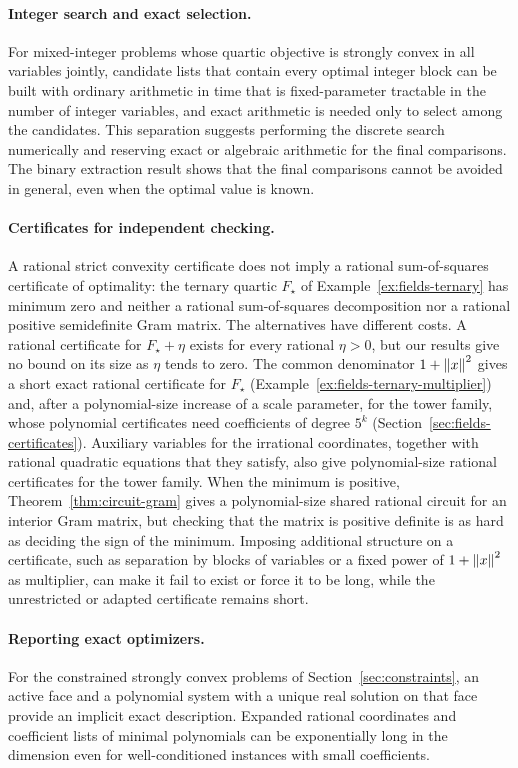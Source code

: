 \paragraph{Integer search and exact selection.}
For mixed-integer problems whose quartic objective is strongly convex in all
variables jointly, candidate lists that contain every optimal integer block
can be built with ordinary arithmetic in time that is fixed-parameter
tractable in the number of integer variables, and exact arithmetic is needed
only to select among the candidates. This
separation suggests performing the discrete search numerically and reserving
exact or algebraic arithmetic for the final comparisons. The binary
extraction result shows that the final comparisons cannot be avoided in
general, even when the optimal value is known.

\paragraph{Certificates for independent checking.}
A rational strict convexity certificate does not imply a rational
sum-of-squares certificate of optimality: the ternary quartic $F_\star$ of
Example~\ref{ex:fields-ternary} has minimum zero and neither a rational
sum-of-squares decomposition nor a rational positive semidefinite Gram
matrix. The alternatives have different costs. A rational certificate for
$F_\star+\eta$ exists for every rational $\eta>0$, but our results give no
bound on its size as $\eta$ tends to zero. The common denominator
$1+\left\lVert x\right\rVert^2$ gives a short exact rational certificate for $F_\star$
(Example~\ref{ex:fields-ternary-multiplier}) and, after a polynomial-size
increase of a scale parameter, for the tower family, whose polynomial
certificates need coefficients of degree $5^k$
(Section~\ref{sec:fields-certificates}). Auxiliary variables for the
irrational coordinates, together with rational quadratic equations that they
satisfy, also give polynomial-size rational certificates for the tower
family. When the minimum
is positive, Theorem~\ref{thm:circuit-gram} gives a polynomial-size shared
rational circuit for an interior Gram matrix, but checking that the matrix is
positive definite is as hard as deciding the sign of the minimum. Imposing
additional structure on a certificate, such as separation by blocks of
variables or a fixed power of $1+\left\lVert x\right\rVert^2$ as multiplier, can make it fail to
exist or force it to be long, while the unrestricted or adapted certificate
remains short.

\paragraph{Reporting exact optimizers.}
For the constrained strongly convex problems of
Section~\ref{sec:constraints}, an active face and a polynomial system with a
unique real solution on that face provide an implicit exact description.
Expanded rational coordinates and coefficient lists of minimal polynomials
can be exponentially long in the dimension even for well-conditioned instances
with small coefficients.

